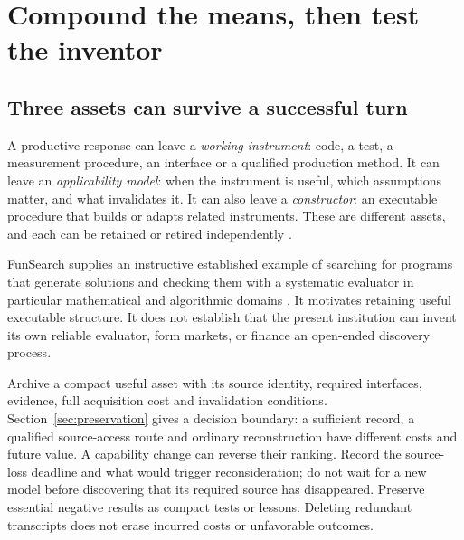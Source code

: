 \section{Compound the means, then test the inventor}
\label{sec:compound}
\subsection{Three assets can survive a successful turn}
A productive response can leave a \emph{working instrument}: code, a test, a measurement procedure, an interface or a qualified production method. It can leave an \emph{applicability model}: when the instrument is useful, which assumptions matter, and what invalidates it. It can also leave a \emph{constructor}: an executable procedure that builds or adapts related instruments. These are different assets, and each can be retained or retired independently \citep[\S3.3]{boucher_genesis}.

FunSearch supplies an instructive established example of searching for programs that generate solutions and checking them with a systematic evaluator in particular mathematical and algorithmic domains \citep{funsearch}. It motivates retaining useful executable structure. It does not establish that the present institution can invent its own reliable evaluator, form markets, or finance an open-ended discovery process.

Archive a compact useful asset with its source identity, required interfaces, evidence, full acquisition cost and invalidation conditions. Section~\ref{sec:preservation} gives a decision boundary: a sufficient record, a qualified source-access route and ordinary reconstruction have different costs and future value. A capability change can reverse their ranking. Record the source-loss deadline and what would trigger reconsideration; do not wait for a new model before discovering that its required source has disappeared. Preserve essential negative results as compact tests or lessons. Deleting redundant transcripts does not erase incurred costs or unfavorable outcomes.

